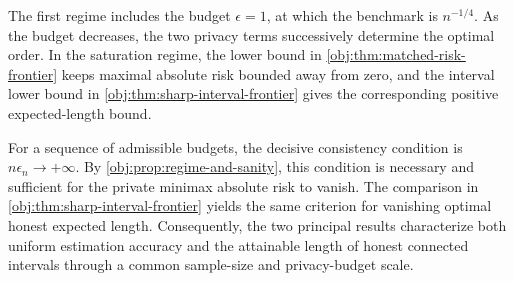 The first regime includes the budget \(\epsilon=1\), at which the benchmark is \(n^{-1/4}\). As the budget decreases, the two privacy terms successively determine the optimal order. In the saturation regime, the lower bound in \cref{obj:thm:matched-risk-frontier} keeps maximal absolute risk bounded away from zero, and the interval lower bound in \cref{obj:thm:sharp-interval-frontier} gives the corresponding positive expected-length bound.

For a sequence of admissible budgets, the decisive consistency condition is \(n\epsilon_n\to+\infty\). By \cref{obj:prop:regime-and-sanity}, this condition is necessary and sufficient for the private minimax absolute risk to vanish. The comparison in \cref{obj:thm:sharp-interval-frontier} yields the same criterion for vanishing optimal honest expected length. Consequently, the two principal results characterize both uniform estimation accuracy and the attainable length of honest connected intervals through a common sample-size and privacy-budget scale.

